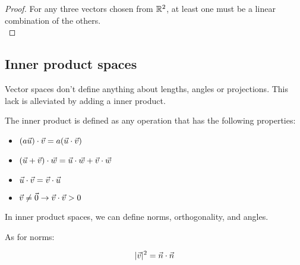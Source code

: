 \begin{proof} \label{proofBaseSizeEqualsSpaceDimension}
For any three vectors chosen from $\mathbb{R}^2$, at least one must be a linear combination of the others. \\
\end{proof}










\subsection{Inner product spaces}
Vector spaces don't define anything about lengths, angles or projections. This lack is alleviated by adding a inner product. 

\begin{definition} The inner product is defined as any operation that has the following properties:
\begin{itemize}
    \item $(a\vec{u}) \cdot \vec{v} = a (\vec{u} \cdot \vec{v}) $
    \item $(\vec{u} + \vec{v}) \cdot \vec{w} = \vec{u} \cdot \vec{w} + \vec{v} \cdot \vec{w}$
    \item $\vec{u} \cdot \vec{v} = \vec{v} \cdot \vec{u}$
    \item $\vec{v} \neq \vec{0} \to \vec{v} \cdot \vec{v} > 0$
\end{itemize}
\end{definition}

In inner product spaces, we can define norms, orthogonality, and angles. 

As for norms:

$$ |\vec{v}|^2 = \vec{n} \cdot \vec{n} $$

